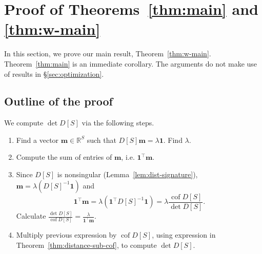 \documentclass[12pt]{amsart}
\theoremstyle{definition}
\newtheorem{eg}[thm]{Example}
\newcommand{\RR}{\mathbb{R}}
\newcommand{\bone}{\mathbf{1}}
\newcommand{\boldm}{\mathbf{m}}
\newcommand{\tr}{\intercal}
\DeclareMathOperator{\cof}{cof}
\begin{document}
\section{Proof of Theorems~\ref{thm:main} and \ref{thm:w-main}}
\label{sec:distance_proofs}

In this section, we prove our main result, Theorem~\ref{thm:w-main}.
Theorem~\ref{thm:main} is an immediate corollary.
The arguments do not make use of results in \S\ref{sec:optimization}.

\subsection{Outline of the proof}

We compute $\det D[S]$ via the following steps.

\begin{enumerate}[label=(\Roman*)]
\item
Find a vector $\boldm \in \RR^S$ such that $D[S]\boldm = \lambda \bone$.
Find $\lambda$.

\item 
Compute the sum of entries of $\boldm$, i.e. $\bone^\tr \boldm$.

\item 
Since $D[S]$ is nonsingular (Lemma~\ref{lem:dist-signature}), $\boldm = \lambda (D[S]^{-1} \bone)$ and
\[
	\bone^\tr \boldm = \lambda (\bone^\tr D[S]^{-1} \bone) = \lambda \frac{\cof D[S]}{\det D[S]}.
\]
Calculate $\displaystyle \frac{\det D[S]}{\cof D[S]} = \frac{\lambda}{\bone^\tr \boldm}$.



\item
Multiply previous expression by $\cof D[S]$, using expression in Theorem~\ref{thm:distance-sub-cof}, to compute $\det D[S]$.
\end{enumerate}

	
\end{document}
